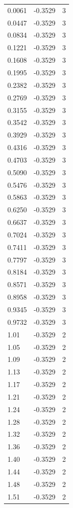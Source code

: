\begin{longtable}{lrr}
  0.0061 & -0.3529 & 3 \\
  0.0447 & -0.3529 & 3 \\
  0.0834 & -0.3529 & 3 \\
  0.1221 & -0.3529 & 3 \\
  0.1608 & -0.3529 & 3 \\
  0.1995 & -0.3529 & 3 \\
  0.2382 & -0.3529 & 3 \\
  0.2769 & -0.3529 & 3 \\
  0.3155 & -0.3529 & 3 \\
  0.3542 & -0.3529 & 3 \\
  0.3929 & -0.3529 & 3 \\
  0.4316 & -0.3529 & 3 \\
  0.4703 & -0.3529 & 3 \\
  0.5090 & -0.3529 & 3 \\
  0.5476 & -0.3529 & 3 \\
  0.5863 & -0.3529 & 3 \\
  0.6250 & -0.3529 & 3 \\
  0.6637 & -0.3529 & 3 \\
  0.7024 & -0.3529 & 3 \\
  0.7411 & -0.3529 & 3 \\
  0.7797 & -0.3529 & 3 \\
  0.8184 & -0.3529 & 3 \\
  0.8571 & -0.3529 & 3 \\
  0.8958 & -0.3529 & 3 \\
  0.9345 & -0.3529 & 3 \\
  0.9732 & -0.3529 & 3 \\
  1.01 & -0.3529 & 2 \\
  1.05 & -0.3529 & 2 \\
  1.09 & -0.3529 & 2 \\
  1.13 & -0.3529 & 2 \\
  1.17 & -0.3529 & 2 \\
  1.21 & -0.3529 & 2 \\
  1.24 & -0.3529 & 2 \\
  1.28 & -0.3529 & 2 \\
  1.32 & -0.3529 & 2 \\
  1.36 & -0.3529 & 2 \\
  1.40 & -0.3529 & 2 \\
  1.44 & -0.3529 & 2 \\
  1.48 & -0.3529 & 2 \\
  1.51 & -0.3529 & 2 \\

\end{longtable}
